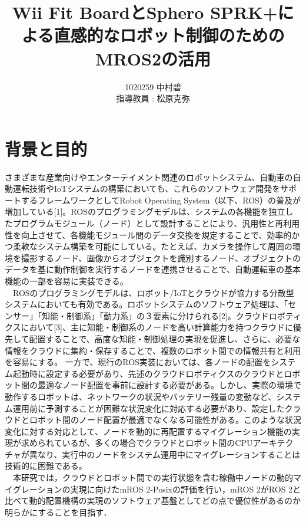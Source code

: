\documentclass[11pt]{ujarticle}
\author{%
1020259 中村碧\\指導教員 : 松原克弥
}
\title{Wii Fit BoardとSphero SPRK+による直感的なロボット制御のためのMROS2の活用}
\begin{document}
\maketitle

\section{背景と目的}
さまざまな産業向けやエンターテイメント関連のロボットシステム、自動車の自動運転技術やIoTシステムの構築においても、これらのソフトウェア開発をサポートするフレームワークとしてRobot Operating System（以下、ROS）の普及が増加している[1]。ROSのプログラミングモデルは、システムの各機能を独立したプログラムモジュール（ノード）として設計することにより、汎用性と再利用性を向上させて、各機能モジュール間のデータ交換を規定することで、効率的かつ柔軟なシステム構築を可能にしている。たとえば、カメラを操作して周囲の環境を撮影するノード、画像からオブジェクトを識別するノード、オブジェクトのデータを基に動作制御を実行するノードを連携させることで、自動運転車の基本機能の一部を容易に実装できる。
\\　ROSのプログラミングモデルは、ロボット/IoTとクラウドが協力する分散型システムにおいても有効である。ロボットシステムのソフトウェア処理は、「センサー」「知能・制御系」「動力系」の３要素に分けられる[2]。クラウドロボティクスにおいて[3]、主に知能・制御系のノードを高い計算能力を持つクラウドに優先して配置することで、高度な知能・制御処理の実現を促進し、さらに、必要な情報をクラウドに集約・保存することで、複数のロボット間での情報共有と利用を容易にする。
一方で、現行のROS実装においては、各ノードの配置をシステム起動時に設定する必要があり、先述のクラウドロボティクスのクラウドとロボット間の最適なノード配置を事前に設計する必要がある。しかし、実際の環境で動作するロボットは、ネットワークの状況やバッテリー残量の変動など、システム運用前に予測することが困難な状況変化に対応する必要があり、設定したクラウドとロボット間のノード配置が最適でなくなる可能性がある。このような状況変化に対する対応として、ノードを動的に再配置するマイグレーション機能の実現が求められているが、多くの場合でクラウドとロボット間のCPUアーキテクチャが異なり、実行中のノードをシステム運用中にマイグレーションすることは技術的に困難である。
\\　本研究では，クラウドとロボット間での実行状態を含む稼働中ノードの動的マイグレーションの実現に向けたmROS 2-Posixの評価を行い，mROS 2がROS 2と比べて動的配置機構の実現のソフトウェア基盤としてどの点で優位性があるのか明らかにすることを目指す．
\end{document}
